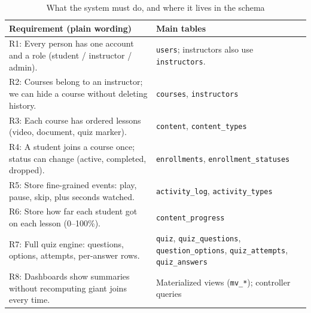 \begin{table}[htbp]
\centering
\caption{What the system must do, and where it lives in the schema}
\label{tab:funcreq}
\small
\begin{tabular}{@{}p{8cm}l@{}}
\toprule
\textbf{Requirement (plain wording)} & \textbf{Main tables} \\
\midrule
R1: Every person has one account and a role (student / instructor / admin). & \texttt{users}; instructors also use \texttt{instructors}. \\
R2: Courses belong to an instructor; we can hide a course without deleting history. & \texttt{courses}, \texttt{instructors} \\
R3: Each course has ordered lessons (video, document, quiz marker). & \texttt{content}, \texttt{content\_types} \\
R4: A student joins a course once; status can change (active, completed, dropped). & \texttt{enrollments}, \texttt{enrollment\_statuses} \\
R5: Store fine-grained events: play, pause, skip, plus seconds watched. & \texttt{activity\_log}, \texttt{activity\_types} \\
R6: Store how far each student got on each lesson (0--100\%). & \texttt{content\_progress} \\
R7: Full quiz engine: questions, options, attempts, per-answer rows. & \texttt{quiz}, \texttt{quiz\_questions}, \texttt{question\_options}, \texttt{quiz\_attempts}, \texttt{quiz\_answers} \\
R8: Dashboards show summaries without recomputing giant joins every time. & Materialized views (\texttt{mv\_*}); controller queries \\
\bottomrule
\end{tabular}
\end{table}

